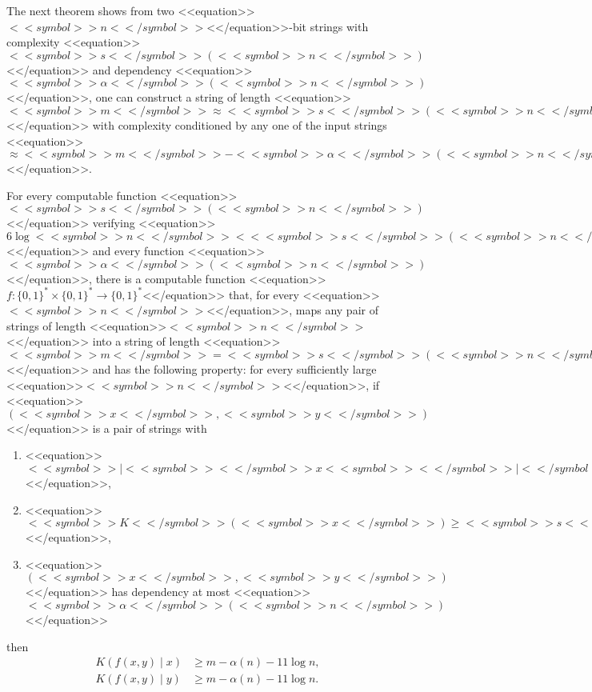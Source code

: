 \documentclass[proceedings]{stacs}
\def\zo{\{0,1\}}
\def\mapping{\rightarrow}
\begin{document}
The next theorem shows from two <<equation>>$<<symbol>>n<</symbol>>$<</equation>>-bit strings with complexity <<equation>>$<<symbol>>s<</symbol>>(<<symbol>>n<</symbol>>)$<</equation>> and dependency <<equation>>$<<symbol>>\alpha<</symbol>>(<<symbol>>n<</symbol>>)$<</equation>>, one can construct a string of length <<equation>>$<<symbol>>m<</symbol>> \approx <<symbol>>s<</symbol>>(<<symbol>>n<</symbol>>)<<symbol>>/<</symbol>>2$<</equation>> with complexity conditioned by any one of the input strings <<equation>>$\approx <<symbol>>m<</symbol>> -<<symbol>>\alpha<</symbol>>(<<symbol>>n<</symbol>>)$<</equation>>.
\begin{theorem}
\label{t:result3}
For every computable function <<equation>>$<<symbol>>s<</symbol>>(<<symbol>>n<</symbol>>)$<</equation>> verifying <<equation>>$6 \log <<symbol>>n<</symbol>> < <<symbol>>s<</symbol>>(<<symbol>>n<</symbol>>) \leq <<symbol>>n<</symbol>>$<</equation>> and every function <<equation>>$<<symbol>>\alpha<</symbol>>(<<symbol>>n<</symbol>>)$<</equation>>, there is a computable function <<equation>>$f: \zo^* \times \zo^* \mapping \zo^*$<</equation>> that, for every <<equation>>$<<symbol>>n<</symbol>>$<</equation>>, maps any pair of strings of length <<equation>>$<<symbol>>n<</symbol>>$<</equation>> into a string of length <<equation>>$<<symbol>>m<</symbol>> = <<symbol>>s<</symbol>>(<<symbol>>n<</symbol>>)<<symbol>>/<</symbol>>2 - 7 \log <<symbol>>n<</symbol>>$<</equation>> and has the following property: for every sufficiently large <<equation>>$<<symbol>>n<</symbol>>$<</equation>>, if <<equation>>$(<<symbol>>x<</symbol>>,<<symbol>>y<</symbol>>)$<</equation>> is a pair of strings with
\begin{enumerate}
	\item <<equation>>$<<symbol>>|<<symbol>><</symbol>>x<<symbol>><</symbol>>|<</symbol>> = <<symbol>>|<<symbol>><</symbol>>y<<symbol>><</symbol>>|<</symbol>> = <<symbol>>n<</symbol>>$<</equation>>,
	\item <<equation>>$<<symbol>>K<</symbol>>(<<symbol>>x<</symbol>>) \geq <<symbol>>s<</symbol>>(<<symbol>>n<</symbol>>), <<symbol>>K<</symbol>>(<<symbol>>y<</symbol>>) \geq <<symbol>>s<</symbol>>(<<symbol>>n<</symbol>>)$<</equation>>,
	\item <<equation>>$(<<symbol>>x<</symbol>>,<<symbol>>y<</symbol>>)$<</equation>> has dependency at most <<equation>>$<<symbol>>\alpha<</symbol>>(<<symbol>>n<</symbol>>)$<</equation>>
\end{enumerate}
then
\[
\begin{array}{ll}
K(f(x,y) \mid x) & \geq m - \alpha(n) - 11 \log n, \\
K(f(x,y) \mid y) & \geq m - \alpha(n) - 11 \log n. 
\end{array}
\]
\end{theorem}
\end{document}

